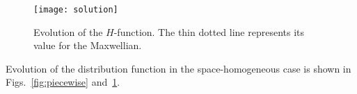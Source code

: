 \documentclass{article}
\begin{document}
\begin{figure}
    \centering
    \texttt{[image: solution]}
    \caption{
        Evolution of the $H$-function. The thin dotted line represents its value for the Maxwellian.
    }\label{fig:piecewise:H}
\end{figure}

Evolution of the distribution function in the space-homogeneous case is shown in
Figs.~\ref{fig:piecewise} and~\ref{fig:piecewise:H}.

\printbibliography
\end{document}
